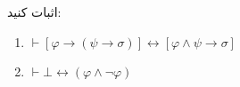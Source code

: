 اثبات کنید:
\begin{enumerate}[label=(\alph*)]
    \item $\vdash [\varphi\to(\psi\to\sigma)]\leftrightarrow[\varphi\wedge\psi\to\sigma]$
    \item $\vdash\bot\leftrightarrow(\varphi\wedge\neg\varphi)$
\end{enumerate}
